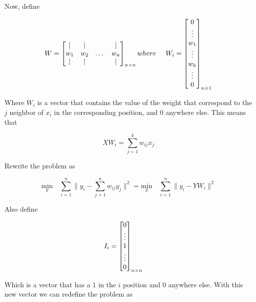 \documentclass{article}
\begin{document}
    Now, define

    \[
        W = 
        \begin{bmatrix}
            |   &  |  &       & |   \\
            w_1 & w_2 & \dots & w_n \\
            |   &  |  &       & |
        \end{bmatrix}_{n \times n}
        where
        \hspace{0.5cm}
        W_i = 
        \begin{bmatrix}
            0 \\
            \vdots \\ 
            w_1 \\
            \vdots \\ 
            w_k \\
            \vdots \\ 
            0 \\
        \end{bmatrix}_{n \times 1}
    \]

    Where $W_i$ is a vector that contains the value of the weight that correspond
    to the $j$ neighbor of $x_i$ in the corresponding position, and 0 anywhere
    else. This means that 

    \begin{equation*}
        X W_i = \sum_{j=1}^k w_{ij} x_j
    \end{equation*}

    Rewrite the problem as

    \begin{equation*}
            \underset{y}{\text{min}} \quad \sum_{i=1}^n \lVert y_i - \sum_{j=1}^n w_{ij} y_j \rVert^2
            =
            \underset{y}{\text{min}} \quad \sum_{i=1}^n \lVert y_i - Y W_i \rVert^2
    \end{equation*}

    Also define 

    \[
        I_i = 
        \begin{bmatrix}
            0 \\
            \vdots \\ 
            1 \\
            \vdots \\ 
            0 \\
        \end{bmatrix}_{n \times n}
        \hspace{0.5cm}
    \]

    Which is a vector that has a $1$ in the $i$ position and $0$ anywhere else.
    With this new vector we can redefine the problem as
\end{document}
